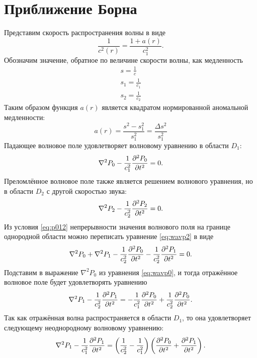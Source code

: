 \documentclass[a4paper, fontsize=14pt]{article}
\begin{document}
	\section{Приближение Борна}
	Представим скорость распространения волны в виде
	\begin{equation}
		\frac{1}{c^2(r)} = \frac{1+a(r)}{c_1^2}.
	\end{equation}
	Обозначим значение, обратное по величине скорости волны, как медленность 
	\begin{gather*}
		s = \frac{1}{c} \\
		s_1 = \frac{1}{c_1} \\
		s_2 = \frac{1}{c_2}
	\end{gather*}
	Таким образом функция $a(r)$ является квадратом нормированной аномальной медленности:
	$$
		a(r) = \frac{s^2 - s_1^2}{s_1^2} = \frac{\Delta s^2}{s_1^2}
	$$
	Падающее волновое поле удовлетворяет волновому уравнению в области $D_1$:
	\begin{equation}
		\nabla^2 P_0 - \frac{1}{c_1^2}\diff[2]{P_0}{t} = 0.
		\label{eq:wavp0}
	\end{equation}
	Преломлённое волновое поле также является решением волнового уравнения, но в области $D_2$ с другой скоростью звука:
	\begin{equation}
		\nabla^2 P_2 - \frac{1}{c_2^2}\diff[2]{P_2}{t} = 0.
		\label{eq:wavp2}
	\end{equation}
	Из условия \ref{eq:p012} непрерывности значения  волнового поля на границе однородной области можно переписать уравнение \ref{eq:wavp2} в виде
	\begin{equation}
		\nabla^2 P_0 + \nabla^2 P_1 - \frac{1}{c_2^2}\diff[2]{P_0}{t} - \frac{1}{c_2^2}\diff[2]{P_1}{t}  = 0.
		\label{eq:wavp01sum}
	\end{equation}
	Подставим в выражение $\nabla^2 P_0$ из уравнения \ref{eq:wavp0}, и
	тогда отражённое волновое поле будет удовлетворять уравнению 
	\begin{equation}
		 \nabla^2 P_1 - \frac{1}{c_2^2}\diff[2]{P_1}{t}  = - \frac{1}{c_1^2}\diff[2]{P_0}{t} + \frac{1}{c_2^2}\diff[2]{P_0}{t}.
	\end{equation}
	Так как отражённая волна распространяется в области $D_1$, то она удовлетворяет следующему неоднородному волновому уравнению:
	\begin{equation}
		\nabla^2 P_1 - \frac{1}{c_1^2}\diff[2]{P_1}{t}  = \left(\frac{1}{c_2^2} - \frac{1}{c_1^2}\right)\left(\diff[2]{P_0}{t} + \diff[2]{P_1}{t}\right).
		\label{eq:wavp1inh}
	\end{equation}
\end{document}
